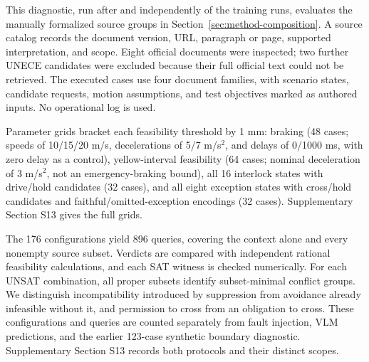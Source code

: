 This diagnostic, run after and independently of the training runs, evaluates the manually formalized
source groups in Section~\ref{sec:method-composition}. A source catalog records
the document version, URL, paragraph or page, supported interpretation, and
scope. Eight official documents were inspected; two further UNECE candidates
were excluded because their full official text could not be retrieved.
The executed cases use four document families, with scenario states,
candidate requests, motion assumptions, and test objectives marked as authored
inputs. No operational log is used.

Parameter grids bracket each feasibility threshold by 1 mm: braking (48
cases; speeds of 10/15/20 m/s, decelerations of 5/7 m/s$^2$, and delays of
0/1000 ms, with zero delay as a control), yellow-interval feasibility (64
cases; nominal deceleration of 3 m/s$^2$, not an emergency-braking bound),
all 16 interlock states with drive/hold candidates (32 cases), and all eight
exception states with cross/hold candidates and faithful/omitted-exception
encodings (32 cases). Supplementary Section S13 gives the full grids.

The 176 configurations yield 896 queries, covering the context alone and
every nonempty source subset. Verdicts are compared with independent
rational feasibility calculations, and each SAT witness is checked numerically.
For each UNSAT combination, all proper subsets identify subset-minimal
conflict groups. We distinguish incompatibility introduced by suppression
from avoidance already infeasible without it, and permission to cross from
an obligation to cross. These configurations and queries are counted
separately from fault injection, VLM predictions, and the earlier 123-case
synthetic boundary diagnostic. Supplementary Section S13 records both
protocols and their distinct scopes.

